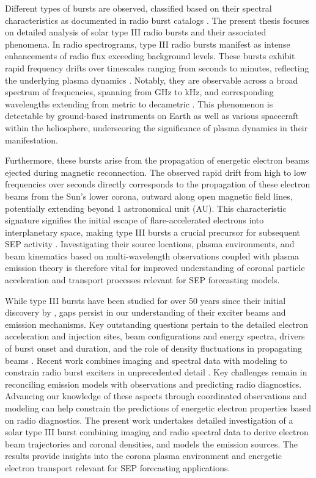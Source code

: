 Different types of bursts are observed, classified based on their spectral characteristics as documented in radio burst catalogs \citep{wild_1963}. The present thesis focuses on detailed analysis of solar type III radio bursts and their associated phenomena.
In radio spectrograms, type III radio bursts manifest as intense enhancements of radio flux exceeding background levels. These bursts exhibit rapid frequency drifts over timescales ranging from seconds to minutes, reflecting the underlying plasma dynamics \citep{reid_2017}. Notably, they are observable across a broad spectrum of frequencies, spanning from GHz to kHz, and corresponding wavelengths extending from metric to decametric \citep{wild_1950a, lecacheux_1989, bonnin_2008}. This phenomenon is detectable by ground-based instruments on Earth as well as various spacecraft within the heliosphere, underscoring the significance of plasma dynamics in their manifestation.

Furthermore, these bursts arise from the propagation of energetic electron beams ejected during magnetic reconnection. The observed rapid drift from high to low frequencies over seconds directly corresponds to the propagation of these electron beams from the Sun's lower corona, outward along open magnetic field lines, potentially extending beyond 1 astronomical unit (AU). This characteristic signature signifies the initial escape of flare-accelerated electrons into interplanetary space, making type III bursts a crucial precursor for subsequent SEP activity \citep{cane_2002, macdowall_2003}.
Investigating their source locations, plasma environments, and beam kinematics based on multi-wavelength observations coupled with plasma emission theory is therefore vital for improved understanding of coronal particle acceleration and transport processes relevant for SEP forecasting models.

While type III bursts have been studied for over 50 years since their initial discovery by \citet{wild_1950a, wild_1950b, wild_1950c}, gaps persist in our understanding of their exciter beams and emission mechanisms. Key outstanding questions pertain to the detailed electron acceleration and injection sites, beam configurations and energy spectra, drivers of burst onset and duration, and the role of density fluctuations in propagating beams \citep{reid_2018a, reid_2018b, li_2012a}. Recent work combines imaging and spectral data with modeling to constrain radio burst exciters in unprecedented detail \citep{chen_2013b, kontar_2017}. Key challenges remain in reconciling emission models with observations and predicting radio diagnostics. Advancing our knowledge of these aspects through coordinated observations and modeling can help constrain the predictions of energetic electron properties based on radio diagnostics. The present work undertakes detailed investigation of a solar type III burst combining imaging and radio spectral data to derive electron beam trajectories and coronal densities, and models the emission sources. The results provide insights into the corona plasma environment and energetic electron transport relevant for SEP forecasting applications.

